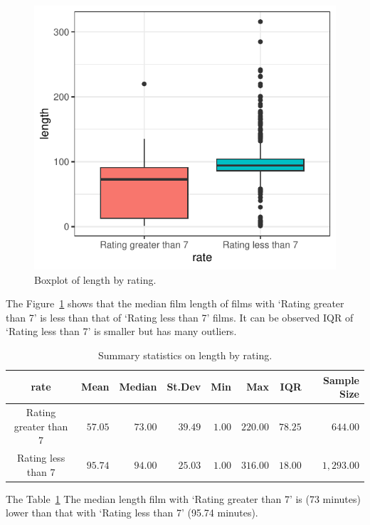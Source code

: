 \documentclass[
  letterpaper,
  DIV=11,
  numbers=noendperiod]{scrartcl}
\begin{document}
\begin{figure}

{\centering \includegraphics{Group_06_Analysis_files/figure-pdf/fig-boxplot-length-1.pdf}

}

\caption{\label{fig-boxplot-length}Boxplot of length by rating.}

\end{figure}

The Figure~\ref{fig-boxplot-length} shows that the median film length of
films with `Rating greater than 7' is less than that of `Rating less
than 7' films. It can be observed IQR of `Rating less than 7' is smaller
but has many outliers.

\hypertarget{tbl-summary-length}{}
\begin{longtable}{crrrrrrr}
\caption{\label{tbl-summary-length}Summary statistics on length by rating. }\tabularnewline

\toprule
rate & Mean & Median & St.Dev & Min & Max & IQR & Sample Size \\ 
\midrule\addlinespace[2.5pt]
Rating greater than 7 & $57.05$ & $73.00$ & $39.49$ & $1.00$ & $220.00$ & $78.25$ & $644.00$ \\ 
Rating less than 7 & $95.74$ & $94.00$ & $25.03$ & $1.00$ & $316.00$ & $18.00$ & $1,293.00$ \\ 
\bottomrule
\end{longtable}

The Table~\ref{tbl-summary-length} The median length film with `Rating
greater than 7' is (73 minutes) lower than that with `Rating less than
7' (95.74 minutes).
\end{document}
